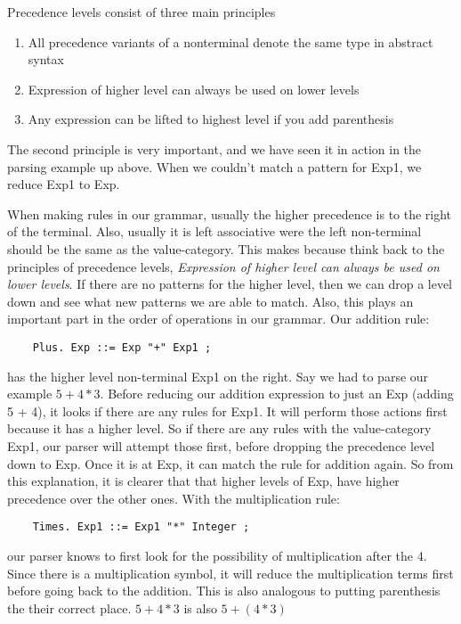 \documentclass{article}
\begin{document}
\medskip\noindent
Precedence levels consist of three main principles
\begin{enumerate}
    \item All precedence variants of a nonterminal denote the same type in abstract syntax
    \item Expression of higher level can always be used on lower levels
    \item Any expression can be lifted to highest level if you add parenthesis\cite{IPL}
\end{enumerate}

\medskip\noindent
The second principle is very important, and we have seen it in action in the parsing example up above. When we couldn't match a pattern for Exp1, we reduce Exp1 to Exp. 

When making rules in our grammar, usually the higher precedence is to the right of the terminal. Also, usually it is left associative were the left non-terminal should be the same as the value-category. This makes because think back to the principles of precedence levels, \textit{Expression of higher level can always be used on lower levels}. If there are no patterns for the higher level, then we can drop a level down and see what new patterns we are able to match. Also, this plays an important part in the order of operations in our grammar. Our addition rule:
 \begin{lstlisting}
    Plus. Exp ::= Exp "+" Exp1 ;
 \end{lstlisting}

has the higher level non-terminal Exp1 on the right. Say we had to parse our example $5 + 4 * 3$. Before reducing our addition expression to just an Exp (adding 5 + 4), it looks if there are any rules for Exp1. It will perform those actions first because it has a higher level. So if there are any rules with the value-category Exp1, our parser will attempt those first, before dropping the precedence level down to Exp. Once it is at Exp, it can match the rule for addition again. So from this explanation, it is clearer that that higher levels of Exp, have higher precedence over the other ones. With the multiplication rule:
 \begin{lstlisting}
    Times. Exp1 ::= Exp1 "*" Integer ;
 \end{lstlisting}
 our parser knows to first look for the possibility of multiplication after the 4. Since there is a multiplication symbol, it will reduce the multiplication terms first before going back to the addition. This is also analogous to putting parenthesis the their correct place. $5 + 4 * 3$ is also $5 + (4 * 3)$
 
\end{document}
